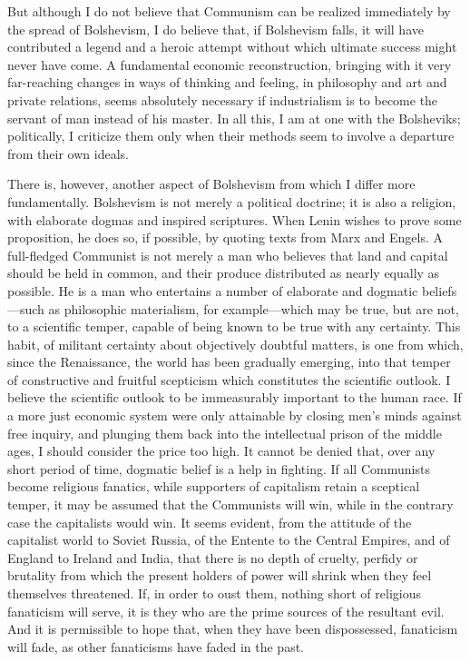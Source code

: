 But although I do not believe that Communism can be realized immediately by the spread of Bolshevism, I do believe that, if Bolshevism falls, it will have contributed a legend and a heroic attempt without which ultimate success might never have come. A fundamental economic reconstruction, bringing with it very far-reaching changes in ways of thinking and feeling, in philosophy and art and private relations, seems absolutely necessary if industrialism is to become the servant of man instead of his master. In all this, I am at one with the Bolsheviks; politically, I criticize them only when their methods seem to involve a departure from their own ideals.

There is, however, another aspect of Bolshevism from which I differ more fundamentally. Bolshevism is not merely a political doctrine; it is also a religion, with elaborate dogmas and inspired scriptures. When Lenin wishes to prove some proposition, he does so, if possible, by quoting texts from Marx and Engels. A full-fledged Communist is not merely a man who believes that land and capital should be held in common, and their produce distributed as nearly equally as possible. He is a man who entertains a number of elaborate and dogmatic beliefs---such as philosophic materialism, for example---which may be true, but are not, to a scientific temper, capable of being known to be true with any certainty. This habit, of militant certainty about objectively doubtful matters, is one from which, since the Renaissance, the world has been gradually emerging, into that temper of constructive and fruitful scepticism which constitutes the scientific outlook. I believe the scientific outlook to be immeasurably important to the human race. If a more just economic system were only attainable by closing men's minds against free inquiry, and plunging them back into the intellectual prison of the middle ages, I should consider the price too high. It cannot be denied that, over any short period of time, dogmatic belief is a help in fighting. If all Communists become religious fanatics, while supporters of capitalism retain a sceptical temper, it may be assumed that the Communists will win, while in the contrary case the capitalists would win. It seems evident, from the attitude of the capitalist world to Soviet Russia, of the Entente to the Central Empires, and of England to Ireland and India, that there is no depth of cruelty, perfidy or brutality from which the present holders of power will shrink when they feel themselves threatened. If, in order to oust them, nothing short of religious fanaticism will serve, it is they who are the prime sources of the resultant evil. And it is permissible to hope that, when they have been dispossessed, fanaticism will fade, as other fanaticisms have faded in the past.

